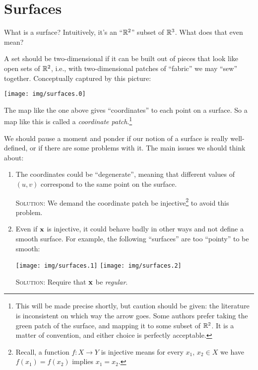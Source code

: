 \section{Surfaces}

\M What is a surface? Intuitively, it's an ``$\mathbb{R}^{2}$'' subset of
$\mathbb{R}^{3}$. What does that even mean?

A set should be two-dimensional if it can be built out of pieces that
look like open sets of $\mathbb{R}^{2}$, i.e., with two-dimensional patches of
``fabric'' we may ``sew'' together. Conceptually captured by this picture:
\begin{center}
  \texttt{[image: img/surfaces.0]}
\end{center}
The map like the one above gives ``coordinates'' to each point on a
surface. So a map like this is called a \emph{coordinate
patch}.\footnote{This will be made precise shortly, but caution should
be given: the literature is inconsistent on which way the arrow
goes. Some authors prefer taking the green patch of the surface, and
mapping it to some subset of $\mathbb{R}^{2}$. It is a matter of convention,
and either choice is perfectly acceptable.}

 We should pause a moment and
ponder if our notion of a surface is really well-defined, or if there
are some problems with it. The main issues we should think about:
\begin{enumerate}
\item The coordinates could be ``degenerate'', meaning that different
  values of $(u,v)$ correspond to the same point on the surface.

  \textsc{Solution:} We demand the coordinate patch be
  injective\footnote{Recall, a function $f\colon X\to Y$ is injective
  means for every $x_{1}$, $x_{2}\in X$ we have $f(x_{1})=f(x_{2})$ implies $x_{1}=x_{2}$.} to
  avoid this problem.
\item Even if $\mathbf{x}$ is injective, it could behave badly in other
  ways and not define a smooth surface. For example, the following
  ``surfaces'' are too ``pointy'' to be smooth:
  \begin{center}
    \texttt{[image: img/surfaces.1]} \texttt{[image: img/surfaces.2]}
  \end{center}

  \textsc{Solution:} Require that $\mathbf{x}$ be \emph{regular}.
\end{enumerate}


